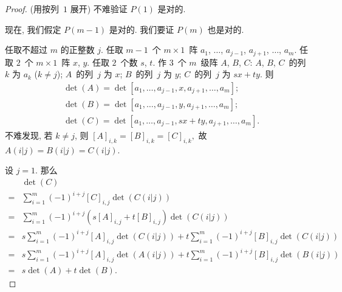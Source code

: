 \documentclass[../libro.tex]{subfiles}
\begin{document}
\begin{proof}
    (用按列~\(1\) 展开)
    不难验证 \(P(1)\) 是对的.

    现在, 我们假定 \(P(m-1)\) 是对的.
    我们要证 \(P(m)\) 也是对的.

    任取不超过 \(m\) 的正整数 \(j\).
    任取 \(m-1\)~个 \(m \times 1\)~阵
    \(a_1\), \(\dots\), \(a_{j-1}\),
    \(a_{j+1}\), \(\dots\), \(a_m\).
    任取 \(2\)~个 \(m \times 1\)~阵 \(x\), \(y\).
    任取 \(2\)~个数 \(s\), \(t\).
    作 \(3\)~个 \(m\)~级阵 \(A\), \(B\), \(C\):
    \(A\), \(B\), \(C\)~的列~\(k\) 为 \(a_k\) (\(k \neq j\));
    \(A\)~的列~\(j\) 为 \(x\);
    \(B\)~的列~\(j\) 为 \(y\);
    \(C\)~的列~\(j\) 为 \(sx + ty\).
    则
    \begin{align*}
        & \det {(A)}
        = \det
        {[a_1, \dots, a_{j-1}, x, a_{j+1}, \dots, a_m]};
        \\
        & \det {(B)}
        = \det
        {[a_1, \dots, a_{j-1}, y, a_{j+1}, \dots, a_m]};
        \\
        & \det {(C)}
        = \det
        {[a_1, \dots, a_{j-1}, sx + ty, a_{j+1}, \dots, a_m]}.
    \end{align*}
    不难发现, 若 \(k \neq j\), 则
    \(
        [A]_{i,k} = [B]_{i,k} = [C]_{i,k},
    \)
    故
    \(
        A(i|j) = B(i|j) = C(i|j).
    \)

    设 \(j = 1\).
    那么
    \begin{align*}
        & \det {(C)}
        \\
        = {} &
        \sum_{i = 1}^{m} {
            (-1)^{i+j} [C]_{i,j} \det {(C(i|j))}
        }
        \\
        = {} &
        \sum_{i = 1}^{m} {
            (-1)^{i+j} (s[A]_{i,j} + t[B]_{i,j}) \det {(C(i|j))}
        }
        \\
        = {} &
        s\sum_{i = 1}^{m} {
            (-1)^{i+j} [A]_{i,j} \det {(C(i|j))}
        }
        +
        t\sum_{i = 1}^{m} {
            (-1)^{i+j} [B]_{i,j} \det {(C(i|j))}
        }
        \\
        = {} &
        s\sum_{i = 1}^{m} {
            (-1)^{i+j} [A]_{i,j} \det {(A(i|j))}
        }
        +
        t\sum_{i = 1}^{m} {
            (-1)^{i+j} [B]_{i,j} \det {(B(i|j))}
        }
        \\
        = {} &
        s \det{(A)} + t \det{(B)}.
    \end{align*}


\end{proof}
\end{document}
